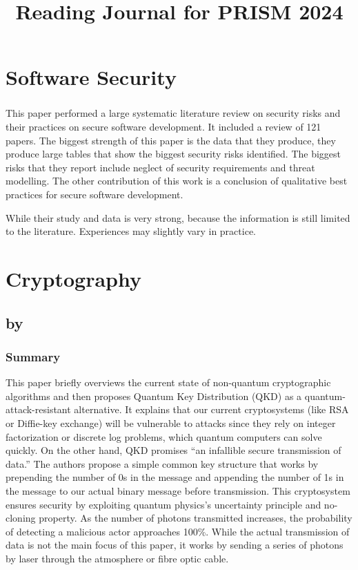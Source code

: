 \documentclass{article}
\begin{document}

\title{Reading Journal for PRISM 2024}
\author{}
\date{}
\maketitle

\section{Software Security}
\subsubsection{}
This paper performed a large systematic literature review on security risks and their practices on secure software development.
It included a review of 121 papers.
The biggest strength of this paper is the data that they produce, they produce large tables that show the biggest security risks identified.
The biggest risks that they report include neglect of security requirements and threat modelling.
The other contribution of this work is a conclusion of qualitative best practices for secure software development.

While their study and data is very strong, because the information is still limited to the literature.
Experiences may slightly vary in practice.

\section{Cryptography}
\subsection{ by  \cite{babber_quantum_cryptography}}
\subsubsection*{Summary}
This paper briefly overviews the current state of non-quantum cryptographic algorithms and then proposes Quantum Key Distribution (QKD) as a quantum-attack-resistant alternative.
It explains that our current cryptosystems (like RSA or Diffie-key exchange) will be vulnerable to attacks since they rely on integer factorization or discrete log problems, which quantum computers can solve quickly.
On the other hand, QKD promises “an infallible secure transmission of data.”
The authors propose a simple common key structure that works by prepending the number of 0s in the message and appending the number of 1s in the message to our actual binary message before transmission.
This cryptosystem ensures security by exploiting quantum physics's uncertainty principle and no-cloning property.
As the number of photons transmitted increases, the probability of detecting a malicious actor approaches 100\%.
While the actual transmission of data is not the main focus of this paper, it works by sending a series of photons by laser through the atmosphere or fibre optic cable.
\end{document}
